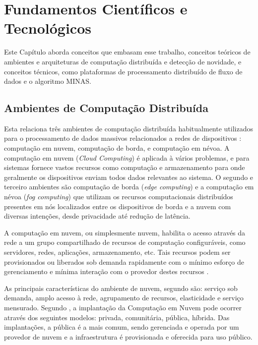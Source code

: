
\chapter{Fundamentos Científicos e Tecnológicos}\label{cha:fundamentos}

Este Capítulo aborda conceitos que embasam esse trabalho,
conceitos teóricos de
ambientes e arquiteturas de computação distribuída e detecção de novidade,
e conceitos técnicos, como plataformas de processamento distribuído de fluxo
de dados e o algoritmo MINAS.

\section{Ambientes de Computação Distribuída}

Esta \Section relaciona três ambientes de computação distribuída habitualmente
utilizados para o processamento de dados massivos relacionados a redes de
dispositivos \iot: computação em nuvem, computação de borda, e computação em névoa.
A computação em nuvem (\emph{Cloud Computing}) é
aplicada à vários problemas, e para sistemas \iot
fornece vastos recursos como computação e armazenamento para onde geralmente os dispositivos
enviam todos dados relevantes ao sistema.
O segundo e terceiro ambientes são computação de borda (\emph{edge computing})
e a computação em névoa (\emph{fog computing}) que utilizam os recursos
computacionais distribuídos presentes em nós localizados entre os dispositivos
de borda e a nuvem com diversas 
intenções, desde privacidade até redução de latência.


A computação em nuvem, ou simplesmente nuvem, habilita o acesso através da rede
a um grupo compartilhado de recursos de computação configuráveis, como
servidores, redes, aplicações, armazenamento, etc.
Tais recursos podem ser provisionados ou liberados sob
demanda rapidamente com o mínimo esforço de gerenciamento
e mínima interação com o provedor destes recursos \cite{NIST2011}.

As principais características do ambiente de nuvem, segundo 
são: serviço sob demanda, amplo acesso à rede, agrupamento de recursos,
elasticidade e serviço mensurado.
Segundo , a implantação da Computação em Nuvem pode
ocorrer através dos seguintes modelos: privada, comunitária, pública, híbrida.
Das implantações, a pública é a mais comum, sendo gerenciada e operada por um
provedor de nuvem e a infraestrutura é provisionada e oferecida para uso
público.

